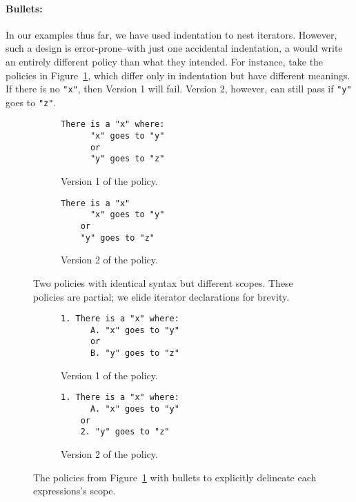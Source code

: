 \paragraph{Bullets: } 

In our examples thus far, we have used indentation to nest iterators.
%
However, such a design is error-prone--with just one accidental indentation, 
a \ce{} would write an entirely different policy than what they intended.
%
For instance, take the policies in Figure~\ref{f:indentation}, which differ only in indentation but have different meanings.
%
If there is no \lstinline[language=CNL]|"x"|, then Version 1 will fail.
%
Version 2, however, can still pass if \lstinline[language=CNL]|"y"| goes to \lstinline[language=CNL]|"z"|.

\begin{figure}[t]
    \begin{subfigure}[b]{\columnwidth}
  \begin{lstlisting}[language=CNL]
    There is a "x" where:
      "x" goes to "y"
      or
      "y" goes to "z"
  \end{lstlisting}
  \caption{Version 1 of the policy.}
  \end{subfigure}
  \begin{subfigure}[b]{\columnwidth}
  \begin{lstlisting}[language=CNL]
    There is a "x"
      "x" goes to "y"
    or
    "y" goes to "z"
    \end{lstlisting}
    \caption{Version 2 of the policy.}
    \end{subfigure}
    \caption{Two policies with identical syntax but different scopes. These policies are partial; we elide iterator declarations for brevity.}
    \label{f:indentation}
\end{figure}

\begin{figure}[t]
    \begin{subfigure}[b]{\columnwidth}
  \begin{lstlisting}[language=CNL]
    1. There is a "x" where:
      A. "x" goes to "y"
      or
      B. "y" goes to "z"
  \end{lstlisting}
  \caption{Version 1 of the policy.}
  \end{subfigure}
  \begin{subfigure}[b]{\columnwidth}
  \begin{lstlisting}[language=CNL]
    1. There is a "x" where:
      A. "x" goes to "y"
    or
    2. "y" goes to "z"
    \end{lstlisting}
    \caption{Version 2 of the policy.}
    \end{subfigure}
    \caption{The policies from Figure~\ref{f:indentation} with bullets to explicitly delineate each expressions's scope.}
    \label{f:bullets}
\end{figure}

